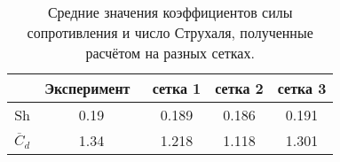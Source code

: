 \begin{table}[]
	\begin{tabular}{|c|c|c|c|c|}
	\hline
	& Эксперимент~\cite{henderson1997nonlinear} & сетка 1 & сетка 2 & сетка 3 \\ \hline
	Sh               & 0.19        & 0.189   & 0.186   & 0.191   \\ \hline
	$\overline{C}_d$ & 1.34        & 1.218   & 1.118   & 1.301   \\ \hline
	\end{tabular}
	\caption{Средние значения коэффициентов силы сопротивления и число Струхаля, полученные расчётом на разных сетках.}
	\label{tabl:table}
\end{table}
\clearpage